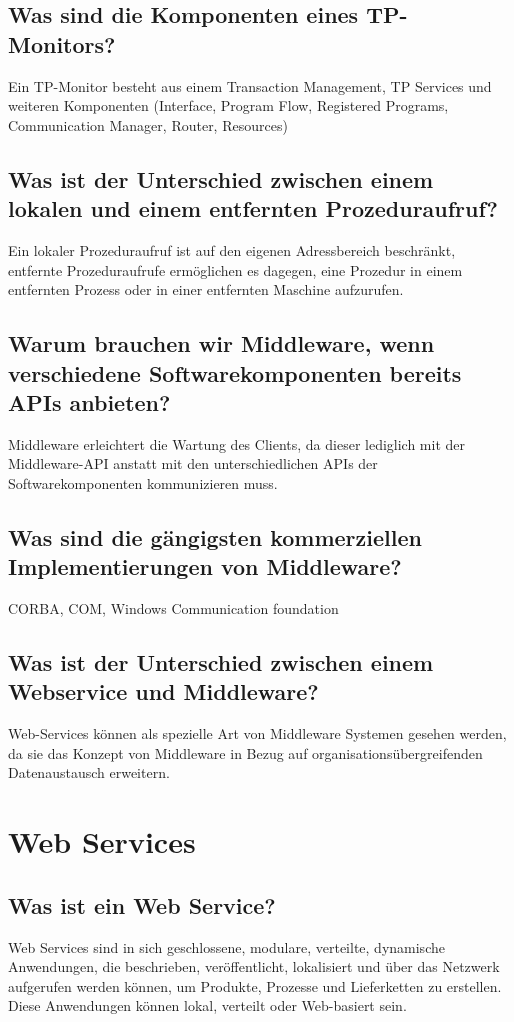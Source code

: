 \documentclass{article}
\begin{document}
\subsection{Was sind die Komponenten eines TP-Monitors?}
Ein TP-Monitor besteht aus einem Transaction Management, TP Services und weiteren Komponenten (Interface, Program Flow, Registered Programs, Communication Manager, Router, Resources)
\subsection{Was ist der Unterschied zwischen einem lokalen und einem entfernten Prozeduraufruf?}
Ein lokaler Prozeduraufruf ist auf den eigenen Adressbereich beschränkt, entfernte Prozeduraufrufe ermöglichen es dagegen, eine Prozedur in einem entfernten Prozess oder in einer entfernten Maschine aufzurufen.
\subsection{Warum brauchen wir Middleware, wenn verschiedene Softwarekomponenten bereits APIs anbieten?}
Middleware erleichtert die Wartung des Clients, da dieser lediglich mit der Middleware-API anstatt mit den unterschiedlichen APIs der Softwarekomponenten kommunizieren muss.
\subsection{Was sind die gängigsten kommerziellen Implementierungen von Middleware?}
CORBA, COM, Windows Communication foundation
\subsection{Was ist der Unterschied zwischen einem Webservice und Middleware?}
Web-Services können als spezielle Art von Middleware Systemen gesehen werden, da sie das Konzept von Middleware in Bezug auf organisationsübergreifenden Datenaustausch erweitern.

\section{Web Services}
\subsection{Was ist ein Web Service?}
Web Services sind in sich geschlossene, modulare, verteilte, dynamische Anwendungen, die beschrieben, veröffentlicht, lokalisiert und über das Netzwerk aufgerufen werden können, um Produkte, Prozesse und Lieferketten zu erstellen. Diese Anwendungen können lokal, verteilt oder Web-basiert sein.
\end{document}
